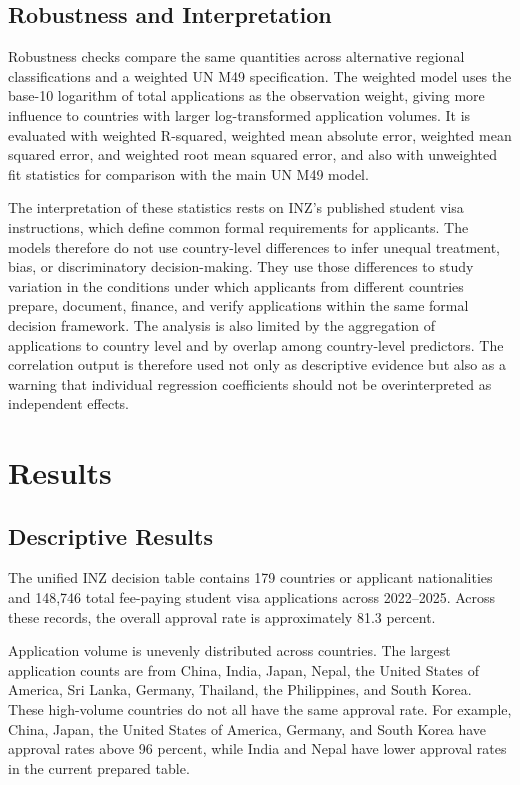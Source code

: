 \documentclass[runningheads]{llncs}
\begin{document}
\subsection{Robustness and Interpretation}

Robustness checks compare the same quantities across alternative regional classifications and a weighted UN M49 specification. The weighted model uses the base-10 logarithm of total applications as the observation weight, giving more influence to countries with larger log-transformed application volumes. It is evaluated with weighted R-squared, weighted mean absolute error, weighted mean squared error, and weighted root mean squared error, and also with unweighted fit statistics for comparison with the main UN M49 model.

The interpretation of these statistics rests on INZ's published student visa instructions, which define common formal requirements for applicants. The models therefore do not use country-level differences to infer unequal treatment, bias, or discriminatory decision-making. They use those differences to study variation in the conditions under which applicants from different countries prepare, document, finance, and verify applications within the same formal decision framework. The analysis is also limited by the aggregation of applications to country level and by overlap among country-level predictors. The correlation output is therefore used not only as descriptive evidence but also as a warning that individual regression coefficients should not be overinterpreted as independent effects.

\section{Results}

\subsection{Descriptive Results}

The unified INZ decision table contains 179 countries or applicant nationalities and 148,746 total fee-paying student visa applications across 2022--2025. Across these records, the overall approval rate is approximately 81.3 percent.

Application volume is unevenly distributed across countries. The largest application counts are from China, India, Japan, Nepal, the United States of America, Sri Lanka, Germany, Thailand, the Philippines, and South Korea. These high-volume countries do not all have the same approval rate. For example, China, Japan, the United States of America, Germany, and South Korea have approval rates above 96 percent, while India and Nepal have lower approval rates in the current prepared table.
\end{document}
